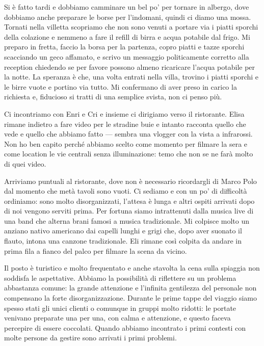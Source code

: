 Si è fatto tardi e dobbiamo camminare un bel po' per tornare in albergo, dove dobbiamo anche preparare le borse per l'indomani, quindi ci diamo una mossa. Tornati nella villetta scopriamo che non sono venuti a portare via i piatti sporchi della colazione e nemmeno a fare il refill di birra e acqua potabile dal frigo. Mi preparo in fretta, faccio la borsa per la partenza, copro piatti e tazze sporchi scacciando un geco affamato, e scrivo un messaggio politicamente corretto alla reception chiedendo se per favore possono almeno ricaricare l'acqua potabile per la notte. La speranza è che, una volta entrati nella villa, trovino i piatti sporchi e le birre vuote e portino via tutto. Mi confermano di aver preso in carico la richiesta e, fiducioso si tratti di una semplice svista, non ci penso più.

Ci incontriamo con Enri e Cri e insieme ci dirigiamo verso il ristorante. Elisa rimane indietro a fare video per le stradine buie e intanto racconta quello che vede e quello che abbiamo fatto — sembra una vlogger con la vista a infrarossi. Non ho ben capito perché abbiamo scelto come momento per filmare la sera e come location le vie centrali senza illuminazione: temo che non se ne farà molto di quei video.

Arriviamo puntuali al ristorante, dove non è necessario ricordargli di Marco Polo dal momento che metà tavoli sono vuoti. Ci sediamo e con un po' di difficoltà ordiniamo: sono molto disorganizzati, l'attesa è lunga e altri ospiti arrivati dopo di noi vengono serviti prima. Per fortuna siamo intrattenuti dalla musica live di una band che alterna brani famosi a musica tradizionale. Mi colpisce molto un anziano nativo americano dai capelli lunghi e grigi che, dopo aver suonato il flauto, intona una canzone tradizionale. Eli rimane così colpita da andare in prima fila a fianco del palco per filmare la scena da vicino.

Il posto è turistico e molto frequentato e anche stavolta la cena sulla spiaggia non soddisfa le aspettative. Abbiamo la possibilità di riflettere su un problema abbastanza comune: la grande attenzione e l'infinita gentilezza del personale non compensano la forte disorganizzazione. Durante le prime tappe del viaggio siamo spesso stati gli unici clienti o comunque in gruppi molto ridotti: le portate venivano preparate una per una, con calma e attenzione, e questo faceva percepire di essere coccolati. Quando abbiamo incontrato i primi contesti con molte persone da gestire sono arrivati i primi problemi.

